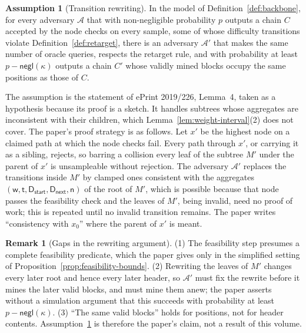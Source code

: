 \documentclass[11pt,a4paper]{article}
\theoremstyle{definition}
\newtheorem{assumption}[theorem]{Assumption}
\newtheorem{remark}[theorem]{Remark}
\newcommand{\negl}{\mathsf{negl}}
\newcommand{\Adv}{\mathcal{A}}
\begin{document}
\begin{assumption}[Transition rewriting]\label{ass:rewriting}
In the model of Definition~\ref{def:backbone}, for every adversary $\Adv$
that with non-negligible probability $p$ outputs a chain $C$ accepted by the
node checks on every sample, some of whose difficulty transitions violate
Definition~\ref{def:retarget}, there is an adversary $\Adv'$ that makes the
same number of oracle queries, respects the retarget rule, and with
probability at least $p-\negl(\kappa)$ outputs a chain $C'$ whose validly
mined blocks occupy the same positions as those of $C$.
\end{assumption}

The assumption is the statement of ePrint 2019/226, Lemma~4, taken as a
hypothesis because its proof is a sketch. It handles subtrees whose
aggregates are inconsistent with their children, which
Lemma~\ref{lem:weight-interval}(2) does not cover. The paper's proof
strategy is as follows. Let $x'$ be the highest node on a claimed path at
which the node checks fail. Every path through $x'$, or carrying it as a
sibling, rejects, so barring a collision every leaf of the subtree $M'$
under the parent of $x'$ is unsampleable without rejection. The adversary
$\Adv'$ replaces the transitions inside $M'$ by clamped ones consistent with
the aggregates $(\mathsf{w},\mathsf{t},\mathsf{D}_{\mathsf{start}},
\mathsf{D}_{\mathsf{next}},\mathsf{n})$ of the root of $M'$, which is
possible because that node passes the feasibility check and the leaves of
$M'$, being invalid, need no proof of work; this is repeated until no
invalid transition remains. The paper writes ``consistency with $x_0$''
where the parent of $x'$ is meant.

\begin{remark}[Gaps in the rewriting argument]\label{rem:rewriting-gaps}
(1) The feasibility step presumes a complete feasibility predicate, which
the paper gives only in the simplified setting of
Proposition~\ref{prop:feasibility-bounds}. (2) Rewriting the leaves of $M'$
changes every later root and hence every later header, so $\Adv'$ must fix
the rewrite before it mines the later valid blocks, and must mine them anew;
the paper asserts without a simulation argument that this succeeds with
probability at least $p-\negl(\kappa)$. (3) ``The same valid blocks'' holds
for positions, not for header contents. Assumption~\ref{ass:rewriting} is
therefore the paper's claim, not a result of this volume.
\end{remark}
\end{document}
